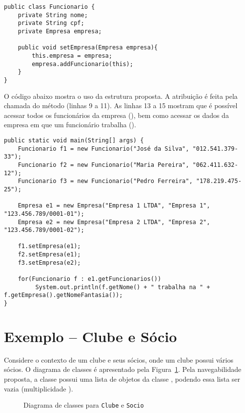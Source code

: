\begin{verbatim}
public class Funcionario {
	private String nome;
	private String cpf;
	private Empresa empresa;
	
	public void setEmpresa(Empresa empresa){
		this.empresa = empresa;
		empresa.addFuncionario(this);
	}
}
\end{verbatim} 

O código abaixo mostra o uso da estrutura proposta. A atribuição é feita pela chamada do método  (linhas 9 a 11). As linhas 13 a 15 mostram que é possível acessar todos os funcionários da empresa (), bem como acessar os dados da empresa em que um funcionário trabalha ().

\begin{verbatim}
public static void main(String[] args) {
	Funcionario f1 = new Funcionario("José da Silva", "012.541.379-33");
	Funcionario f2 = new Funcionario("Maria Pereira", "062.411.632-12");
	Funcionario f3 = new Funcionario("Pedro Ferreira", "178.219.475-25");

	Empresa e1 = new Empresa("Empresa 1 LTDA", "Empresa 1", "123.456.789/0001-01");
	Empresa e2 = new Empresa("Empresa 2 LTDA", "Empresa 2", "123.456.789/0001-02");

	f1.setEmpresa(e1);
	f2.setEmpresa(e1);
	f3.setEmpresa(e2);

	for(Funcionario f : e1.getFuncionarios())
		 System.out.println(f.getNome() + " trabalha na " + f.getEmpresa().getNomeFantasia());
}
\end{verbatim}

\section{Exemplo -- Clube e Sócio}

Considere o contexto de um clube e seus sócios, onde um clube possui vários sócios. O diagrama de classes é apresentado pela Figura~\ref{fig:exemplo-clube-socio}. Pela navegabilidade proposta, a classe  possui uma lista de objetos da classe , podendo essa lista ser vazia (multiplicidade ).

\begin{figure}[h]
	\centering
	
	
	\caption{Diagrama de classes para \texttt{Clube} e \texttt{Socio}}
	\label{fig:exemplo-clube-socio}
\end{figure}

